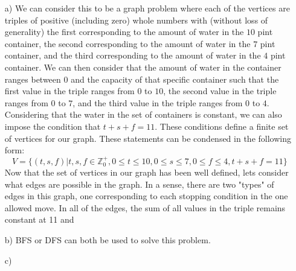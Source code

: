 \documentclass{article}
\begin{document}
\begin{solution}
\begin{itemize}
	\item[a)] We can consider this to be a graph problem where each of the vertices are triples of positive (including zero) whole numbers with (without loss of generality) the first corresponding to the amount of water in the $10$ pint container, the second corresponding to the amount of water in the $7$ pint container, and the third corresponding to the amount of water in the $4$ pint container.  We can then consider that the amount of water in the container ranges between $0$ and the capacity of that specific container such that the first value in the triple ranges from $0$ to $10$, the second value in the triple ranges from $0$ to $7$, and the third value in the triple ranges from $0$ to $4$.  Considering that the water in the set of containers is constant, we can also impose the condition that $t+s+f=11$.  These conditions define a finite set of vertices for our graph.  These statements can be condensed in the following form:
	$$V=\{(t,s,f)| t,s,f \in \mathbb{Z}^+_0, 0 \leq t \leq 10, 0 \leq s \leq 7, 0 \leq f \leq 4, t+s+f=11\}$$
	Now that the set of vertices in our graph has been well defined, lets consider what edges are possible in the graph.  In a sense, there are two "types" of edges in this graph, one corresponding to each stopping condition in the one allowed move.  In all of the edges, the sum of all values in the triple remains constant at 11 and 
	\item[b)] BFS or DFS can both be used to solve this problem.
	\item[c)] 
\end{itemize}
\end{solution}


\end{document}
